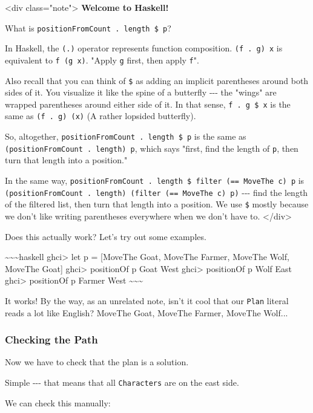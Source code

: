 \documentclass[]{article}
\begin{document}
\textless{}div class="note"\textgreater{} \textbf{Welcome to Haskell!}

What is \texttt{positionFromCount\ .\ length\ \$\ p}?

In Haskell, the \texttt{(.)} operator represents function composition.
\texttt{(f\ .\ g)\ x} is equivalent to \texttt{f\ (g\ x)}. "Apply \texttt{g}
first, then apply \texttt{f}".

Also recall that you can think of \texttt{\$} as adding an implicit parentheses
around both sides of it. You visualize it like the spine of a butterfly -\/-\/-
the "wings" are wrapped parentheses around either side of it. In that sense,
\texttt{f\ .\ g\ \$\ x} is the same as \texttt{(f\ .\ g)\ (x)} (A rather
lopsided butterfly).

So, altogether, \texttt{positionFromCount\ .\ length\ \$\ p} is the same as
\texttt{(positionFromCount\ .\ length)\ p}, which says "first, find the length
of \texttt{p}, then turn that length into a position."

In the same way,
\texttt{positionFromCount\ .\ length\ \$\ filter\ (==\ MoveThe\ c)\ p} is
\texttt{(positionFromCount\ .\ length)\ (filter\ (==\ MoveThe\ c)\ p)} -\/-\/-
find the length of the filtered list, then turn that length into a position. We
use \texttt{\$} mostly because we don't like writing parentheses everywhere when
we don't have to. \textless{}/div\textgreater{}

Does this actually work? Let's try out some examples.

\textasciitilde{}\textasciitilde{}\textasciitilde{}haskell ghci\textgreater{}
let p = {[}MoveThe Goat, MoveThe Farmer, MoveThe Wolf, MoveThe Goat{]}
ghci\textgreater{} positionOf p Goat West ghci\textgreater{} positionOf p Wolf
East ghci\textgreater{} positionOf p Farmer West
\textasciitilde{}\textasciitilde{}\textasciitilde{}

It works! By the way, as an unrelated note, isn't it cool that our \texttt{Plan}
literal reads a lot like English? MoveThe Goat, MoveThe Farmer, MoveThe Wolf...

\subsubsection{Checking the Path}

Now we have to check that the plan is a solution.

Simple -\/-\/- that means that all \texttt{Characters} are on the east side.

We can check this manually:
\end{document}
